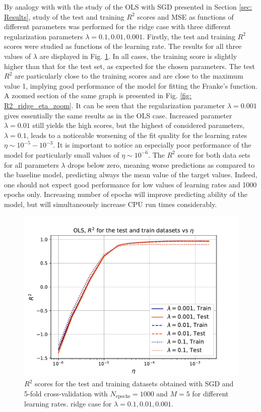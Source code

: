 \documentclass{emulateapj}
\begin{document}
By analogy with with the study of the OLS with SGD presented in Section \ref{sec: Results}, study of the test and training $R^2$ scores and MSE as functions of different parameters was performed for the ridge case with three different regularization parameters $\lambda=0.1,0.01,0.001$. Firstly, the test and training $R^2$ scores were studied as functions of the learning rate. The results for all three values of $\lambda$ are displayed in Fig. \ref{fig: R2_ridge_eta}. In all cases, the training score is slightly higher than that for the test set, as expected for the chosen parameters. The test $R^2$ are particularly close to the training scores and are close to the maximum value 1, implying good performance of the model for fitting the Franke's function. A zoomed section of the same graph is presented in Fig. \ref{fig: R2_ridge_eta_zoom}. It can be seen that the regularization parameter $\lambda=0.001$ gives essentially the same results as in the OLS case. Increased parameter $\lambda=0.01$ still yields the high scores, but the highest of considered parameters, $\lambda=0.1$, leads to a noticeable worsening of the fit quality for the learning rates $\eta\sim 10^{-5}-10^{-3}$. It is important to notice an especially poor performance of the model for particularly small values of $\eta\sim 10^{-6}$. The $R^2$ score for both data sets for all parameters $\lambda$ drops below zero, meaning worse predictions as compared to the baseline model, predicting always the mean value of the target values. Indeed, one should not expect good performance for low values of learning rates and 1000 epochs only. Increasing number of epochs will improve predicting ability of the model, but will simultaneously increase CPU run times considerably.

\begin{figure}[!htb]
    \centering
    \includegraphics[width=.49\textwidth]{Figures/ridge_R2_eta.pdf}
    \caption{$R^2$ scores for the test and training datasets obtained with SGD and 5-fold cross-validation with $N_{\mathrm{epochs}}=1000$ and $M=5$ for different learning rates. ridge case for $\lambda=0.1,0.01,0.001$.}
    \label{fig: R2_ridge_eta}
\end{figure}
\end{document}
